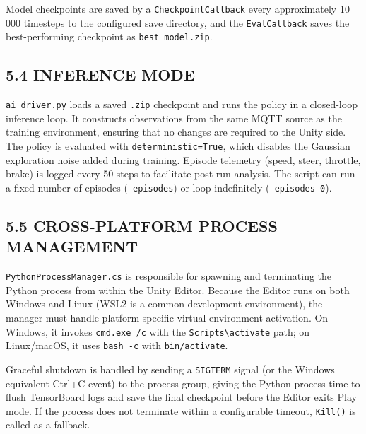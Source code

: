 \documentclass[12pt,a4paper]{article}
\begin{document}
Model checkpoints are saved by a \texttt{CheckpointCallback} every
approximately 10\,000 timesteps to the configured save directory, and the
\texttt{EvalCallback} saves the best-performing checkpoint as
\texttt{best\_model.zip}.

\subsection*{5.4 \quad INFERENCE MODE}

\indent \texttt{ai\_driver.py} loads a saved \texttt{.zip} checkpoint and runs the
policy in a closed-loop inference loop. It constructs observations from the
same MQTT source as the training environment, ensuring that no changes are
required to the Unity side. The policy is evaluated with
\texttt{deterministic=True}, which disables the Gaussian exploration noise
added during training. Episode telemetry (speed, steer, throttle, brake) is
logged every 50 steps to facilitate post-run analysis. The script can run a
fixed number of episodes (\texttt{--episodes}) or loop indefinitely
(\texttt{--episodes 0}).

\subsection*{5.5 \quad CROSS-PLATFORM PROCESS MANAGEMENT}

\indent \texttt{PythonProcessManager.cs} is responsible for spawning and terminating
the Python process from within the Unity Editor. Because the Editor runs on
both Windows and Linux (WSL2 is a common development environment), the manager
must handle platform-specific virtual-environment activation. On Windows, it
invokes \texttt{cmd.exe /c} with the \texttt{Scripts\textbackslash activate}
path; on Linux/macOS, it uses \texttt{bash -c} with \texttt{bin/activate}.

Graceful shutdown is handled by sending a \texttt{SIGTERM} signal (or the
Windows equivalent Ctrl+C event) to the process group, giving the Python
process time to flush TensorBoard logs and save the final checkpoint before the
Editor exits Play mode. If the process does not terminate within a configurable
timeout, \texttt{Kill()} is called as a fallback.

\clearpage

\end{document}
